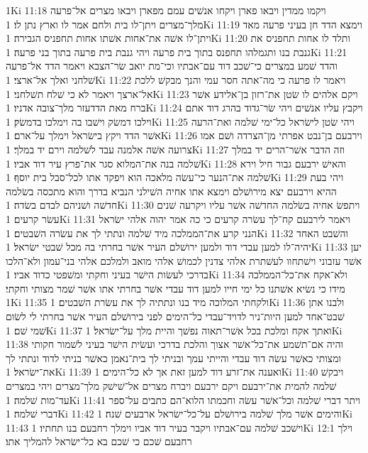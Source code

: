 1Ki 11:18  ויקמו ממדין ויבאו פארן ויקחו אנשׁים עמם מפארן ויבאו מצרים אל־פרעה מלך־מצרים ויתן־לו בית ולחם אמר לו וארץ נתן לו׃
1Ki 11:19  וימצא הדד חן בעיני פרעה מאד ויתן־לו אשׁה את־אחות אשׁתו אחות תחפניס הגבירה׃
1Ki 11:20  ותלד לו אחות תחפניס את גנבת בנו ותגמלהו תחפנס בתוך בית פרעה ויהי גנבת בית פרעה בתוך בני פרעה׃
1Ki 11:21  והדד שׁמע במצרים כי־שׁכב דוד עם־אבתיו וכי־מת יואב שׂר־הצבא ויאמר הדד אל־פרעה שׁלחני ואלך אל־ארצי׃
1Ki 11:22  ויאמר לו פרעה כי מה־אתה חסר עמי והנך מבקשׁ ללכת אל־ארצך ויאמר לא כי שׁלח תשׁלחני׃
1Ki 11:23  ויקם אלהים לו שׂטן את־רזון בן־אלידע אשׁר ברח מאת הדדעזר מלך־צובה אדניו׃
1Ki 11:24  ויקבץ עליו אנשׁים ויהי שׂר־גדוד בהרג דוד אתם וילכו דמשׂק וישׁבו בה וימלכו בדמשׂק׃
1Ki 11:25  ויהי שׂטן לישׂראל כל־ימי שׁלמה ואת־הרעה אשׁר הדד ויקץ בישׂראל וימלך על־ארם׃
1Ki 11:26  וירבעם בן־נבט אפרתי מן־הצרדה ושׁם אמו צרועה אשׁה אלמנה עבד לשׁלמה וירם יד במלך׃
1Ki 11:27  וזה הדבר אשׁר־הרים יד במלך שׁלמה בנה את־המלוא סגר את־פרץ עיר דוד אביו׃
1Ki 11:28  והאישׁ ירבעם גבור חיל וירא שׁלמה את־הנער כי־עשׂה מלאכה הוא ויפקד אתו לכל־סבל בית יוסף׃
1Ki 11:29  ויהי בעת ההיא וירבעם יצא מירושׁלם וימצא אתו אחיה השׁילני הנביא בדרך והוא מתכסה בשׂלמה חדשׁה ושׁניהם לבדם בשׂדה׃
1Ki 11:30  ויתפשׂ אחיה בשׂלמה החדשׁה אשׁר עליו ויקרעה שׁנים עשׂר קרעים׃
1Ki 11:31  ויאמר לירבעם קח־לך עשׂרה קרעים כי כה אמר יהוה אלהי ישׂראל הנני קרע את־הממלכה מיד שׁלמה ונתתי לך את עשׂרה השׁבטים׃
1Ki 11:32  והשׁבט האחד יהיה־לו למען עבדי דוד ולמען ירושׁלם העיר אשׁר בחרתי בה מכל שׁבטי ישׂראל׃
1Ki 11:33  יען אשׁר עזבוני וישׁתחוו לעשׁתרת אלהי צדנין לכמושׁ אלהי מואב ולמלכם אלהי בני־עמון ולא־הלכו בדרכי לעשׂות הישׁר בעיני וחקתי ומשׁפטי כדוד אביו׃
1Ki 11:34  ולא־אקח את־כל־הממלכה מידו כי נשׂיא אשׁתנו כל ימי חייו למען דוד עבדי אשׁר בחרתי אתו אשׁר שׁמר מצותי וחקתי׃
1Ki 11:35  ולקחתי המלוכה מיד בנו ונתתיה לך את עשׂרת השׁבטים׃
1Ki 11:36  ולבנו אתן שׁבט־אחד למען היות־ניר לדויד־עבדי כל־הימים לפני בירושׁלם העיר אשׁר בחרתי לי לשׂום שׁמי שׁם׃
1Ki 11:37  ואתך אקח ומלכת בכל אשׁר־תאוה נפשׁך והיית מלך על־ישׂראל׃
1Ki 11:38  והיה אם־תשׁמע את־כל־אשׁר אצוך והלכת בדרכי ועשׂית הישׁר בעיני לשׁמור חקותי ומצותי כאשׁר עשׂה דוד עבדי והייתי עמך ובניתי לך בית־נאמן כאשׁר בניתי לדוד ונתתי לך את־ישׂראל׃
1Ki 11:39  ואענה את־זרע דוד למען זאת אך לא כל־הימים׃
1Ki 11:40  ויבקשׁ שׁלמה להמית את־ירבעם ויקם ירבעם ויברח מצרים אל־שׁישׁק מלך־מצרים ויהי במצרים עד־מות שׁלמה׃
1Ki 11:41  ויתר דברי שׁלמה וכל־אשׁר עשׂה וחכמתו הלוא־הם כתבים על־ספר דברי שׁלמה׃
1Ki 11:42  והימים אשׁר מלך שׁלמה בירושׁלם על־כל־ישׂראל ארבעים שׁנה׃
1Ki 11:43  וישׁכב שׁלמה עם־אבתיו ויקבר בעיר דוד אביו וימלך רחבעם בנו תחתיו׃
1Ki 12:1  וילך רחבעם שׁכם כי שׁכם בא כל־ישׂראל להמליך אתו׃
